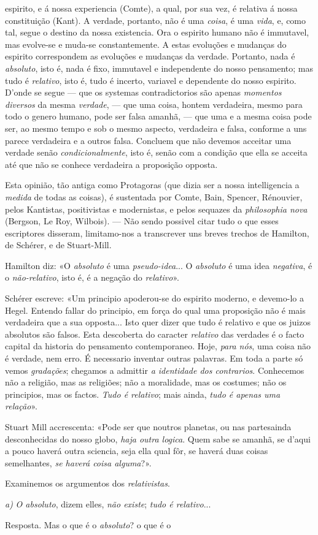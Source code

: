 espirito, e á nossa experiencia (Comte), a qual, por sua vez, é relativa á nossa constituição (Kant). A verdade, portanto, não é uma \emph{coisa}, é uma \emph{vida}, e, como tal, segue o destino da nossa existencia. Ora o espirito humano não é immutavel, mas evolve-se e muda-se constantemente. A estas evoluções e mudanças do espirito correspondem as evoluções e mudanças da verdade. Portanto, nada é \emph{absoluto}, isto é, nada é fixo, immutavel e independente do nosso pensamento; mas tudo é \emph{relativo}, isto é, tudo é incerto, variavel e dependente do nosso espirito. D'onde se segue --- que os systemas contradictorios são apenas \emph{momentos diversos} da mesma \emph{verdade}, --- que uma coisa, hontem verdadeira, mesmo para todo o genero humano, pode ser falsa amanhã, --- que uma e a mesma coisa pode ser, ao mesmo tempo e sob o mesmo aspecto, verdadeira e falsa, conforme a uns parece verdadeira e a outros falsa. Concluem que não devemos acceitar uma verdade senão \emph{condicionalmente}, isto é, senão com a condição que ella se acceita até que não se conhece verdadeira a proposição opposta.\par Esta opinião, tão antiga como Protagoras (que dizia ser a nossa intelligencia a \emph{medida} de todas as coisas), é sustentada por Comte, Bain, Spencer, Rénouvier, pelos Kantistas, positivistas e modernistas, e pelos sequazes da \emph{philosophia nova} (Bergson, Le Roy, Wilbois). --- Não sendo possivel citar tudo o que esses escriptores disseram, limitamo-nos a transcrever uns breves trechos de Hamilton, de Schérer, e de Stuart-Mill.\par Hamilton diz: «O \emph{absoluto} é uma \emph{pseudo-idea}... O \emph{absoluto} é uma idea \emph{negativa}, é o \emph{não-relativo}, isto é, é a negação do \emph{relativo}».\par Schérer escreve: «Um principio apoderou-se do espirito moderno, e devemo-lo a Hegel. Entendo fallar do principio, em força do qual uma proposição não é mais verdadeira que a sua opposta... Isto quer dizer que tudo é relativo e que os juizos absolutos são falsos. Esta descoberta do caracter \emph{relativo} das verdades é o facto capital da historia do pensamento contemporaneo. Hoje, \emph{para nós}, uma coisa não é verdade, nem erro. É necessario inventar outras palavras. Em toda a parte só vemos \emph{gradações}; chegamos a admittir \emph{a identidade dos contrarios}. Conhecemos não a religião, mas as religiões; não a moralidade, mas os costumes; não os principios, mas os factos. \emph{Tudo é relativo}; mais ainda, \emph{tudo é apenas uma relação}».\par Stuart Mill accrescenta: «Pode ser que noutros planetas, ou nas partesainda desconhecidas do nosso globo, \emph{haja outra logica}. Quem sabe se amanhã, se d'aqui a pouco haverá outra sciencia, seja ella qual fôr, se haverá duas coisas semelhantes, \emph{se haverá coisa alguma}?».\par Examinemos os argumentos dos \emph{relativistas}.\par \emph{a)} \emph{O absoluto}, dizem elles, \emph{não existe}; \emph{tudo é relativo}...\par Resposta. Mas o que é o \emph{absoluto}? o que é o 